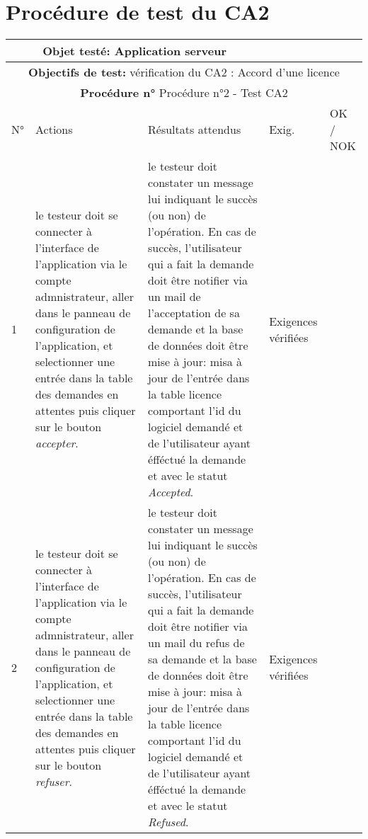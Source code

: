 \section{Procédure de test du CA2}
\begin{table}[!h]
        \centering
        \begin{tabular}{|m{0.6cm}|
                         >{\raggedright\arraybackslash}m{4cm}|
                         >{\raggedright\arraybackslash}m{6.4cm}|
                         >{\raggedright\arraybackslash}m{2cm}|
                         m{1cm}|}
            \hline
            \multicolumn{3}{|c|}{
                \textbf{Objet testé: } Application serveur
            } & \multicolumn{2}{|c|}{
                \textbf{Version: } version    
            } \\
            \hline
            \multicolumn{5}{|c|}{\textbf{Objectifs de test:} 
                vérification du CA2 : Accord d'une licence }\\
            \hline
            \multicolumn{5}{|c|}{
                \textbf{Procédure n° }Procédure n°2 - Test CA2
            } \\
            \hline
            N° & Actions & Résultats attendus & Exig. & OK / NOK \\
            \hline      %
            1 & le testeur doit se connecter à l'interface de l'application
                via le compte admnistrateur, aller dans le panneau de configuration
                de l'application, et selectionner une entrée dans la table des demandes 
                en attentes puis cliquer sur le bouton \emph{accepter}. 
              & le testeur doit constater un message lui indiquant le succès (ou non)
                de l'opération. En cas de succès, l'utilisateur qui a fait la demande 
                doit être notifier via un mail de l'acceptation de sa demande et la 
                base de données doit être mise à jour: misa à jour de l'entrée dans 
                la table licence comportant l'id du logiciel demandé et de l'utilisateur 
                ayant éfféctué la demande et avec le statut \emph{Accepted}.
              & Exigences vérifiées & \\
            \hline
            2 & le testeur doit se connecter à l'interface de l'application
                via le compte admnistrateur, aller dans le panneau de configuration
                de l'application, et selectionner une entrée dans la table des demandes 
                en attentes puis cliquer sur le bouton \emph{refuser}. 
              & le testeur doit constater un message lui indiquant le succès (ou non)
                de l'opération. En cas de succès, l'utilisateur qui a fait la demande 
                doit être notifier via un mail du refus de sa demande et la 
                base de données doit être mise à jour: misa à jour de l'entrée dans 
                la table licence comportant l'id du logiciel demandé et de l'utilisateur 
                ayant éfféctué la demande et avec le statut \emph{Refused}.
              & Exigences vérifiées & \\
            \hline
        \end{tabular} 
        \label{tab:tab2}
\end{table}
\newpage

